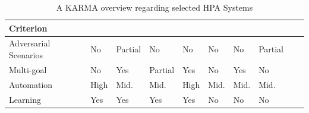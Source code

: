 \begin{table}[h!]
  \centering
  \caption{A KARMA overview regarding selected HPA Systems}
  \label{tab:autoscaling_criteria}
  {\footnotesize
    \renewcommand{\arraystretch}{1.1}
    \begin{tabular}{>{\raggedright\arraybackslash}m{1.3cm}>{\centering\arraybackslash}m{0.6cm}>{\centering\arraybackslash}m{0.6cm}>{\centering\arraybackslash}m{0.6cm}>{\centering\arraybackslash}m{0.6cm}>{\centering\arraybackslash}m{0.6cm}>{\centering\arraybackslash}m{0.6cm}>{\centering\arraybackslash}m{0.6cm}>{\centering\arraybackslash}m{0.6cm}>{\centering\arraybackslash}m{0.6cm}}
      \hline
      \textbf{Criterion}    & \vspace{-0.3cm}\textbf{\cite{gymhpa2022}} & \vspace{-0.3cm}\textbf{\cite{aware2023}} & \vspace{-0.3cm}\textbf{\cite{Rossi2019}} & \vspace{-0.3cm}\textbf{\cite{QoSRL}} & \vspace{-0.3cm}\textbf{\cite{Zhou2024}} & \vspace{-0.3cm}\textbf{\cite{KOSMOS}} & \vspace{-0.3cm}\textbf{\cite{COPA}} \\
      \hline
      \hline
      Adversarial Scenarios & No                                        & Partial                                  & No                                       & No                                   & No                                      & No                                    & Partial                             \\
      \hline
      Multi-goal            & No                                        & Yes                                      & Partial                                  & Yes                                  & No                                      & Yes                                   & No                                  \\
      \hline
      Automation            & High                                      & Mid.                                     & Mid.                                     & High                                 & Mid.                                    & Mid.                                  & Mid.                                \\
      \hline
      Learning              & Yes                                       & Yes                                      & Yes                                      & Yes                                  & No                                      & No                                    & No                                  \\

\end{tabular}}
\end{table}
